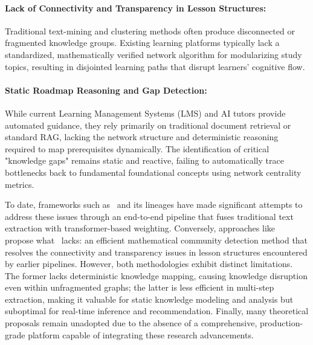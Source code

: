 \paragraph*{{Lack of Connectivity and Transparency in Lesson Structures:}} Traditional text-mining and clustering methods often produce disconnected or fragmented knowledge groups. Existing learning platforms typically lack a standardized, mathematically verified network algorithm for modularizing study topics, resulting in disjointed learning paths that disrupt learners' cognitive flow.
\paragraph*{{Static Roadmap Reasoning and Gap Detection:}} While current Learning Management Systems (LMS) and AI tutors provide automated guidance, they rely primarily on traditional document retrieval or standard RAG, lacking the network structure and deterministic reasoning required to map prerequisites dynamically. The identification of critical "knowledge gaps" remains static and reactive, failing to automatically trace bottlenecks back to fundamental foundational concepts using network centrality metrics.

To date, frameworks such as~\cite{EduKGPipe} and its lineages have made significant attempts to address these issues through an end-to-end pipeline that fuses traditional text extraction with transformer-based weighting. Conversely, approaches like~\cite{DKG} propose what~\cite{EduKGPipe} lacks: an efficient mathematical community detection method that resolves the connectivity and transparency issues in lesson structures encountered by earlier pipelines. However, both methodologies exhibit distinct limitations. The former lacks deterministic knowledge mapping, causing knowledge disruption even within unfragmented graphs; the latter is less efficient in multi-step extraction, making it valuable for static knowledge modeling and analysis but suboptimal for real-time inference and recommendation. Finally, many theoretical proposals remain unadopted due to the absence of a comprehensive, production-grade platform capable of integrating these research advancements. 

